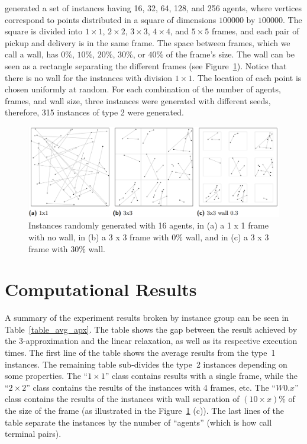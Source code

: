 \cite{Pereira2018TheSM} generated a set of instances having 16, 32, 64, 128, and 256 agents, where vertices correspond to points distributed in a square of dimensions \(100000\) by \(100000\). The square is divided into \(1 \times 1\), \(2 \times 2\), \(3 \times 3\), \(4 \times 4\), and \(5 \times 5\) frames, and each pair of pickup and delivery is in the same frame. The space between frames, which we call a wall, has \(0\%\), \(10\%\), \(20\%\), \(30\%\), or \(40\%\) of the frame’s size. The wall can be seen as a rectangle separating the different frames (see Figure~\ref{fig:instances_type_2}). Notice that there is no wall for the instances with division \(1 \times 1\). The location of each point is chosen uniformly at random. For each combination of the number of agents, frames, and wall size, three instances were generated with different seeds, therefore, 315 instances of type 2 were generated.

\begin{figure}[H]
    \centering
    \includegraphics[scale=0.5]{imgs/instances_type_2.png}
    \caption{Instances randomly generated with 16 agents, in (a) a 1 x 1 frame with no wall, in (b) a 3 x 3 frame with \(0\%\) wall, and in (c) a 3 x 3 frame with \(30\%\) wall.}
    \label{fig:instances_type_2}
\end{figure}

\section{Computational Results}

A summary of the experiment results broken by instance group can be seen in Table~\ref{table_avg_apx}. The table shows the gap between the result achieved by the 3-approximation and the linear relaxation, as well as its respective execution times. The first line of the table shows the average results from the type~1 instances. The remaining table sub-divides the type~2 instances depending on some properties. The ``\(1 \times 1\)'' class contains results with a single frame, while the ``\(2 \times 2\)'' class contains the results of the instances with 4 frames, etc. The ``\(W0.x\)'' class contains the results of the instances with wall separation of \((10 \times x)\%\) of the size of the frame (as illustrated in the Figure~\ref{fig:instances_type_2} (c)). The last lines of the table separate the instances by the number of ``agents'' (which is how \citeauthor{Pereira2018TheSM} call terminal pairs).

